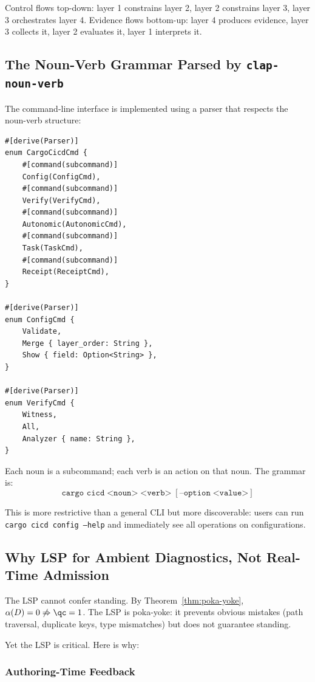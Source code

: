Control flows top-down: layer 1 constrains layer 2, layer 2 constrains layer 3, layer 3 orchestrates layer 4. Evidence flows bottom-up: layer 4 produces evidence, layer 3 collects it, layer 2 evaluates it, layer 1 interprets it.

\subsection{The Noun-Verb Grammar Parsed by \texttt{clap-noun-verb}}

The command-line interface is implemented using a parser that respects the noun-verb structure:

\begin{lstlisting}[caption={Noun-verb grammar in \texttt{cargo-cicd}}]
#[derive(Parser)]
enum CargoCicdCmd {
    #[command(subcommand)]
    Config(ConfigCmd),
    #[command(subcommand)]
    Verify(VerifyCmd),
    #[command(subcommand)]
    Autonomic(AutonomicCmd),
    #[command(subcommand)]
    Task(TaskCmd),
    #[command(subcommand)]
    Receipt(ReceiptCmd),
}

#[derive(Parser)]
enum ConfigCmd {
    Validate,
    Merge { layer_order: String },
    Show { field: Option<String> },
}

#[derive(Parser)]
enum VerifyCmd {
    Witness,
    All,
    Analyzer { name: String },
}
\end{lstlisting}

Each noun is a subcommand; each verb is an action on that noun. The grammar is:
\[ \texttt{cargo cicd} \; \texttt{<noun>} \; \texttt{<verb>} \; [\texttt{--option} \; \texttt{<value>}] \]

This is more restrictive than a general CLI but more discoverable: users can run \texttt{cargo cicd config --help} and immediately see all operations on configurations.

\subsection{Why LSP for Ambient Diagnostics, Not Real-Time Admission}

The LSP cannot confer standing. By Theorem~\ref{thm:poka-yoke}, $\alpha(D) = 0 \not\Rightarrow \qc = 1$. The LSP is poka-yoke: it prevents obvious mistakes (path traversal, duplicate keys, type mismatches) but does not guarantee standing.

Yet the LSP is critical. Here is why:

\subsubsection{Authoring-Time Feedback}

